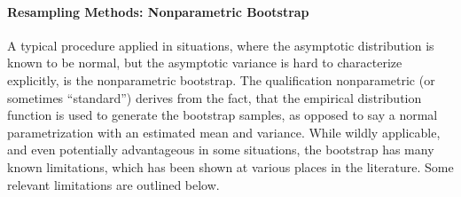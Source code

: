 \documentclass[12pt,a4paper,english]{article} %
\numberwithin{equation}{section}
\theoremstyle{definition}
\theoremstyle{remark}
\theoremstyle{plain}
\begin{document}



\paragraph{Resampling Methods: Nonparametric Bootstrap}

A typical procedure applied in situations, where the asymptotic distribution is known to be normal, but the asymptotic variance is hard to characterize explicitly, is the nonparametric bootstrap.
The qualification nonparametric (or sometimes ``standard'') derives from the fact, that the empirical distribution function is used to generate the bootstrap samples, as opposed to say a normal parametrization with an estimated mean and variance.
While wildly applicable, and even potentially advantageous in some situations, the bootstrap has many known limitations, which has been shown at various places in the literature.
Some relevant limitations are outlined below.
\end{document}

